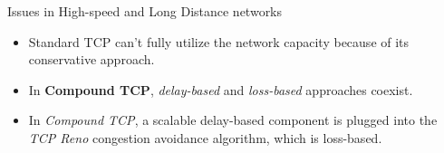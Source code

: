 \begin{frame}{Issues in High-speed and \newline Long Distance
	      networks}
	\begin{itemize}
		\item Standard TCP can't fully utilize
		      the network capacity because of its
		      conservative approach.
		\item In \textbf{Compound TCP},
		      \textit{delay-based} and \textit{loss-based}
		      approaches coexist.
		\item In \textit{Compound TCP}, a scalable delay-based
		      component is plugged into the
		      \textit{TCP Reno} congestion avoidance algorithm,
		      which is loss-based.
	\end{itemize}
\end{frame}
